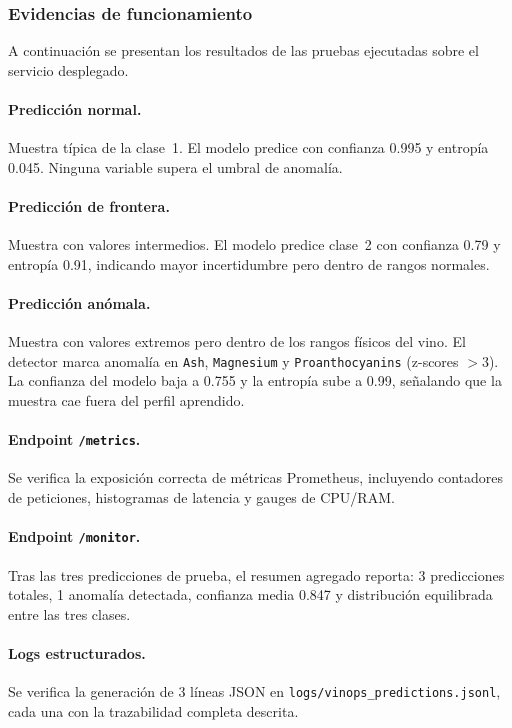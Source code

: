 \subsubsection{Evidencias de funcionamiento}

A continuación se presentan los resultados de las pruebas ejecutadas sobre el servicio desplegado.

\paragraph{Predicción normal.} Muestra típica de la clase~1. El modelo predice con confianza 0.995 y entropía 0.045. Ninguna variable supera el umbral de anomalía.

\paragraph{Predicción de frontera.} Muestra con valores intermedios. El modelo predice clase~2 con confianza 0.79 y entropía 0.91, indicando mayor incertidumbre pero dentro de rangos normales.

\paragraph{Predicción anómala.} Muestra con valores extremos pero dentro de los rangos físicos del vino. El detector marca anomalía en \texttt{Ash}, \texttt{Magnesium} y \texttt{Proanthocyanins} (z-scores $>3$). La confianza del modelo baja a 0.755 y la entropía sube a 0.99, señalando que la muestra cae fuera del perfil aprendido.

\paragraph{Endpoint \texttt{/metrics}.} Se verifica la exposición correcta de métricas Prometheus, incluyendo contadores de peticiones, histogramas de latencia y gauges de CPU/RAM.

\paragraph{Endpoint \texttt{/monitor}.} Tras las tres predicciones de prueba, el resumen agregado reporta: 3 predicciones totales, 1 anomalía detectada, confianza media 0.847 y distribución equilibrada entre las tres clases.

\paragraph{Logs estructurados.} Se verifica la generación de 3 líneas JSON en \texttt{logs/vinops\_predictions.jsonl}, cada una con la trazabilidad completa descrita.

